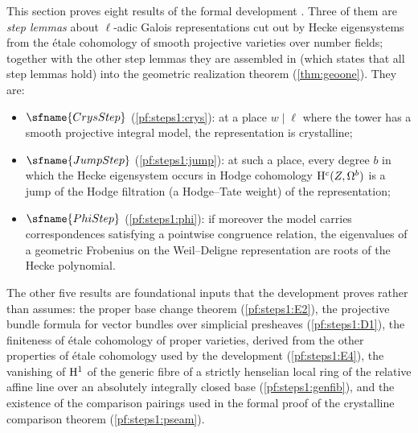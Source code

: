 This section proves eight results of the formal development \cite{LeanSource2026}. Three of them
are \emph{step lemmas} about $\ell$-adic Galois representations cut out by Hecke eigensystems from
the \'etale cohomology of smooth projective varieties over number fields; together with the other
step lemmas they are assembled in  (which states that all
step lemmas hold) into the geometric realization theorem (\cref{thm:geoone}). They are:
\begin{itemize}[nosep]
\item $\sfname{CrysStep}$ (\cref{pf:steps1:crys}): at a place $w\mid\ell$ where the tower has a
  smooth projective integral model, the representation is crystalline;
\item $\sfname{JumpStep}$ (\cref{pf:steps1:jump}): at such a place, every degree $b$ in which the
  Hecke eigensystem occurs in Hodge cohomology $\mathrm{H}^c(Z,\Omega^b)$ is a jump of the Hodge
  filtration (a Hodge--Tate weight) of the representation;
\item $\sfname{PhiStep}$ (\cref{pf:steps1:phi}): if moreover the model carries correspondences
  satisfying a pointwise congruence relation, the eigenvalues of a geometric Frobenius on the
  Weil--Deligne representation are roots of the Hecke polynomial.
\end{itemize}
The other five results are foundational inputs that the development proves rather than assumes:
the proper base change theorem (\cref{pf:steps1:E2}), the projective bundle formula for vector
bundles over simplicial presheaves (\cref{pf:steps1:D1}), the finiteness of \'etale cohomology of
proper varieties, derived from the other properties of \'etale cohomology used by the development
(\cref{pf:steps1:E4}), the vanishing of $\mathrm{H}^1$ of the generic fibre of a strictly henselian
local ring of the relative affine line over an absolutely integrally closed base
(\cref{pf:steps1:genfib}), and the existence of the comparison pairings used in the formal proof of
the crystalline comparison theorem (\cref{pf:steps1:pseam}).

